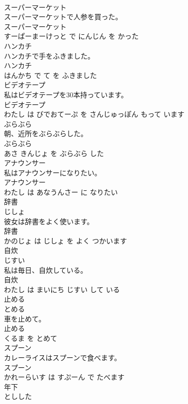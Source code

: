 \documentclass[8pt]{extreport}
\begin{document}
\begin{CJK}{UTF8}{min}
\\	スーパーマーケット	
\\	スーパーマーケットで人参を買った。	
\\	スーパーマーケット 
\\	すーぱーまーけっと で にんじん を かった			
\\	ハンカチ	
\\	ハンカチで手をふきました。	
\\	ハンカチ 
\\	はんかち で て を ふきました			
\\	ビデオテープ	
\\	私はビデオテープを30本持っています。	
\\	ビデオテープ 
\\	わたし は びでおてーぷ を さんじゅっぽん もって います			
\\	ぶらぶら	
\\	朝、近所をぶらぶらした。	
\\	ぶらぶら 
\\	あさ きんじょ を ぶらぶら した			
\\	アナウンサー	
\\	私はアナウンサーになりたい。	
\\	アナウンサー 
\\	わたし は あなうんさー に なりたい			
\\	辞書	
\\	じしょ			
\\	彼女は辞書をよく使います。	
\\	辞書 
\\	かのじょ は じしょ を よく つかいます			
\\	自炊	
\\	じすい			
\\	私は毎日、自炊している。	
\\	自炊 
\\	わたし は まいにち じすい して いる			
\\	止める	
\\	とめる			
\\	車を止めて。	
\\	止める 
\\	くるま を とめて			
\\	スプーン	
\\	カレーライスはスプーンで食べます。	
\\	スプーン 
\\	かれーらいす は すぷーん で たべます			
\\	年下	
\\	としした			

\end{CJK}
\end{document}
